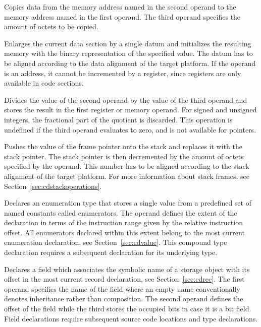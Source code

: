 Copies data from the memory address named in the second operand to the memory address named in the first operand.
The third operand specifies the amount of octets to be copied.


Enlarges the current data section by a single datum and initializes the resulting memory with the binary representation of the specified value.
The datum has to be aligned according to the data alignment of the target platform.
If the operand is an address, it cannot be incremented by a register, since registers are only available in code sections.


Divides the value of the second operand by the value of the third operand and stores the result in the first register or memory operand.
For signed and unsigned integers, the fractional part of the quotient is discarded.
This operation is undefined if the third operand evaluates to zero, and is not available for pointers.


Pushes the value of the frame pointer onto the stack and replaces it with the stack pointer.
The stack pointer is then decremented by the amount of octets specified by the operand.
This number has to be aligned according to the stack alignment of the target platform.
For more information about stack frames, see Section~\ref{sec:cdstackoperations}.


Declares an enumeration type that stores a single value from a predefined set of named constants called enumerators.
The operand defines the extent of the declaration in terms of the instruction range given by the relative instruction offset.
All enumerators declared within this extent belong to the most current enumeration declaration, see Section~\ref{sec:cdvalue}.
This compound type declaration requires a subsequent declaration for its underlying type.


Declares a field which associates the symbolic name of a storage object with its offset in the most current record declaration, see Section~\ref{sec:cdrec}.
The first operand specifies the name of the field where an empty name conventionally denotes inheritance rather than composition.
The second operand defines the offset of the field while the third stores the occupied bits in case it is a bit field.
Field declarations require subsequent source code locations and type declarations.

